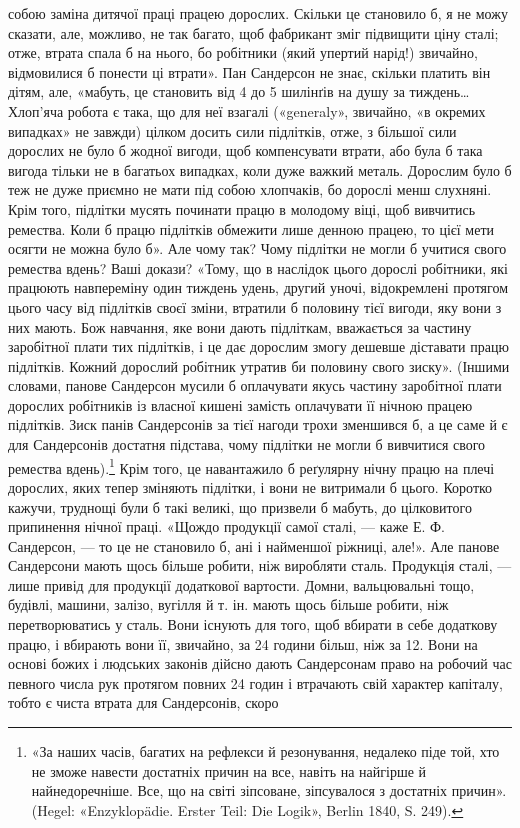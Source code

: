 \parcont{}  %
собою заміна дитячої праці працею дорослих. Скільки це становило
б, я не можу сказати, але, можливо, не так багато, щоб фабрикант
зміг підвищити ціну сталі; отже, втрата спала б на нього,
бо робітники (який упертий нарід!) звичайно, відмовилися б
понести ці втрати». Пан Сандерсон не знає, скільки платить він
дітям, але, «мабуть, це становить від 4 до 5 шилінґів на душу за
тиждень\dots{} Хлоп’яча робота є така, що для неї взагалі («generaly»,
звичайно, «в окремих випадках» не завжди) цілком досить
сили підлітків, отже, з більшої сили дорослих не було б жодної
вигоди, щоб компенсувати втрати, або була б така вигода тільки
не в багатьох випадках, коли дуже важкий металь. Дорослим
було б теж не дуже приємно не мати під собою хлопчаків, бо дорослі
менш слухняні. Крім того, підлітки мусять починати працю
в молодому віці, щоб вивчитись ремества. Коли б працю підлітків
обмежити лише денною працею, то цієї мети осягти не можна
було б». Але чому так? Чому підлітки не могли б учитися свого
ремества вдень? Ваші докази? «Тому, що в наслідок цього дорослі
робітники, які працюють навпереміну один тиждень удень,
другий уночі, відокремлені протягом цього часу від підлітків
своєї зміни, втратили б половину тієї вигоди, яку вони з них
мають. Бож навчання, яке вони дають підліткам, вважається за
частину заробітної плати тих підлітків, і це дає дорослим змогу
дешевше діставати працю підлітків. Кожний дорослий робітник
утратив би половину свого зиску». (Іншими словами, панове
Сандерсон мусили б оплачувати якусь частину заробітної плати
дорослих робітників із власної кишені замість оплачувати її
нічною працею підлітків. Зиск панів Сандерсонів за тієї нагоди
трохи зменшився б, а це саме й є для Сандерсонів достатня підстава,
чому підлітки не могли б вивчитися свого ремества вдень).\footnote{
«За наших часів, багатих на рефлекси й резонування, недалеко
піде той, хто не зможе навести достатніх причин на все, навіть на найгірше
й найнедоречніше. Все, що на світі зіпсоване, зіпсувалося з достатніх
причин». (Hegel: «Enzyklopädie. Erster Teil: Die Logik», Berlin
1840, S. 249).
}
Крім того, це навантажило б реґулярну нічну працю на плечі
дорослих, яких тепер зміняють підлітки, і вони не витримали б
цього. Коротко кажучи, труднощі були б такі великі, що призвели б
мабуть, до цілковитого припинення нічної праці. «Щождо продукції
самої сталі, — каже Е. Ф. Сандерсон, — то це не становило б,
ані і найменшої ріжниці, але!». Але панове Сандерсони мають
щось більше робити, ніж виробляти сталь. Продукція сталі, —
лише привід для продукції додаткової вартости. Домни, вальцювальні
тощо, будівлі, машини, залізо, вугілля й т. ін. мають
щось більше робити, ніж перетворюватись у сталь. Вони існують
для того, щоб вбирати в себе додаткову працю, і вбирають вони
її, звичайно, за 24 години більш, ніж за 12. Вони на основі божих
і людських законів дійсно дають Сандерсонам право на робочий
час певного числа рук протягом повних 24 годин і втрачають свій
характер капіталу, тобто є чиста втрата для Сандерсонів, скоро
\parbreak{}  %
